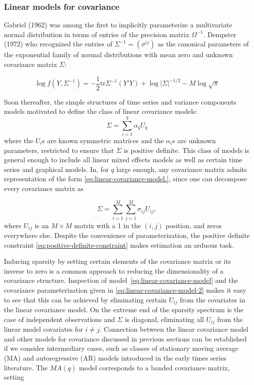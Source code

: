 \documentclass[12pt]{article}
\theoremstyle{definition}
\begin{document}
{{\subsubsection{Linear models for covariance}
Gabriel (1962) was among the first to implicitly parameterize a multivariate normal distribution in terms of entries of the precision matrix $\Omega^{-1}$.  Dempster (1972) who recognized the entries of $\Sigma^{-1} = \left(\sigma^{ij} \right)$ as the canonical parameters of the exponential family of normal distributions with mean zero and unknown covariance matrix $\Sigma$:

\[
\log f\left(Y, \Sigma^{-1}\right) = -\frac{1}{2}\mbox{tr}\Sigma^{-1} \left(Y'Y\right) + \log\vert \Sigma \vert^{-1/2} - M \log\sqrt{\pi}
\]

Soon thereafter, the simple structures of time series and variance components models motivated \citet{anderson1973asymptotically} to define the class of linear covariance models:
\begin{equation}\label{eq:linear-covariance-model}
\Sigma = \sum_{i = 1}^q \alpha_qU_q
\end{equation}
\noindent
where the $U_i$s are known symmetric matrices and the $\alpha_i$s are unknown parameters, restricted to ensure that $\Sigma$ is positive definite. This class of models is general enough to include all linear mixed effects models as well as certain time series and graphical models. In, for $q$ large enough, any covariance matrix admits representation of the form \ref{eq:linear-covariance-model.}, since one can decompose every covariance matrix as 

\begin{equation} \label{eq:linear-covariance-model-2}
\Sigma = \sum_{i = 1}^M \sum_{j = 1}^M \sigma_{ij} U_{ij},
\end{equation}
\noindent
where $U_{ij}$ is an $M \times M$ matrix with a 1 in the $\left(i,j\right)$ position, and zeros everywhere else. Despite the convenience of parameterization, the positive definite constraint \ref{eq:positive-definite-constraint} makes estimation an arduous task.

\bigskip

Inducing sparsity by setting certain elements of the covariance matrix or its inverse to zero is a common approach to reducing the dimensionality of a covariance structure. Inspection of model~\ref{eq:linear-covariance-model} and the covariance parameterization given in \ref{eq:linear-covariance-model-2} makes it easy to see that this can be achieved by eliminating certain $U_{ij}$ from the covariates in the linear covariance model. On the extreme end of the sparsity spectrum is the case of independent observations and $\Sigma$ is diagonal, eliminating all $U_{ij}$ from the linear model covariates for $i \ne j$. Connection between the linear covariance model and other models for covariance discussed in previous sections can be established if we consider intermediary cases, such as classes of stationary moving average (MA) and autoregressive (AR) models introduced in the early times series literature. The $MA(q)$ model corresponds to a banded covariance matrix, setting 

}}
\end{document}
